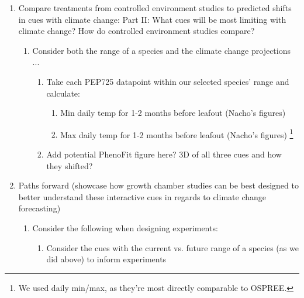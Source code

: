 \documentclass[11pt,letterpaper]{article}
\begin{document}
\begin{enumerate}
\begin{enumerate}
\begin{enumerate}
\item Fig: Variation in treatments across time (graph with year on $x$-axis or divide time in half or such? 
\item Say something about material (seeds/saplings/cuttings)? Can we tie to relevance of predicting future forest communities or such?
\end{enumerate}
\item X\% of studies manipulated which interacting cues? (i.e., how many studies manipulate 1 cues, 2 cues, 3 cues ... of those manipulating 1 cue, what is the breakdown by cue etc.)
\end{enumerate}
\item Compare treatments from controlled environment studies to predicted shifts in cues with climate change: Part II: What cues will be most limiting with climate change? How do controlled environment studies compare? 
\begin{enumerate}
\item Consider both the range of a species and the climate change projections ...
\begin{enumerate}
\item Take each PEP725 datapoint within our selected species' range and calculate:
\begin{enumerate}
\item Min daily temp for 1-2 months before leafout (Nacho's figures)
\item Max daily temp for 1-2 months before leafout (Nacho's figures) \footnote{We used daily min/max, as they're most directly comparable to OSPREE.}
\end{enumerate}
\item Add potential PhenoFit figure here? 3D of all three cues and how they shifted?
\end{enumerate}
\end{enumerate}
\item Paths forward (showcase how growth chamber studies can be best designed to better understand these interactive cues in regards to climate change forecasting) 
\begin{enumerate}
\item Consider the following when designing experiments:
\begin{enumerate}
\item Consider the cues with the current vs. future range of a species (as we did above) to inform experiments

\end{enumerate}
\end{enumerate}
\end{enumerate}
\end{document}
